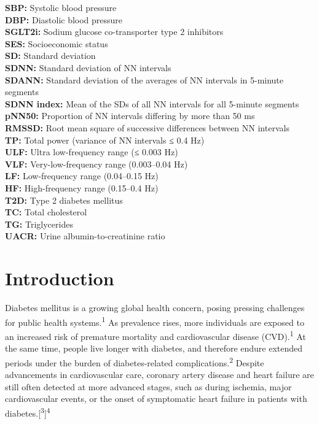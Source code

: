\documentclass[
  letterpaper,
  headsepline=true,
  open=any]{scrbook}
\begin{document}
\textbf{SBP:} Systolic blood pressure\\
\textbf{DBP:} Diastolic blood pressure\\
\textbf{SGLT2i:} Sodium glucose co-transporter type 2 inhibitors\\
\textbf{SES:} Socioeconomic status\\
\textbf{SD:} Standard deviation\\
\textbf{SDNN:} Standard deviation of NN intervals\\
\textbf{SDANN:} Standard deviation of the averages of NN intervals in
5-minute segments\\
\textbf{SDNN index:} Mean of the SDs of all NN intervals for all
5-minute segments\\
\textbf{pNN50:} Proportion of NN intervals differing by more than 50
ms\\
\textbf{RMSSD:} Root mean square of successive differences between NN
intervals\\
\textbf{TP:} Total power (variance of NN intervals ≤ 0.4 Hz)\\
\textbf{ULF:} Ultra low-frequency range (≤ 0.003 Hz)\\
\textbf{VLF:} Very-low-frequency range (0.003--0.04 Hz)\\
\textbf{LF:} Low-frequency range (0.04--0.15 Hz)\\
\textbf{HF:} High-frequency range (0.15--0.4 Hz)\\
\textbf{T2D:} Type 2 diabetes mellitus\\
\textbf{TC:} Total cholesterol\\
\textbf{TG:} Triglycerides\\
\textbf{UACR:} Urine albumin-to-creatinine ratio


\hypertarget{introduction}{%
\chapter{Introduction}\label{introduction}}

\newpage

Diabetes mellitus is a growing global health concern, posing pressing
challenges for public health systems.\textsuperscript{1} As prevalence
rises, more individuals are exposed to an increased risk of premature
mortality and cardiovascular disease (CVD).\textsuperscript{1} At the
same time, people live longer with diabetes, and therefore endure
extended periods under the burden of diabetes-related
complications.\textsuperscript{2} Despite advancements in cardiovascular
care, coronary artery disease and heart failure are still often detected
at more advanced stages, such as during ischemia, major cardiovascular
events, or the onset of symptomatic heart failure in patients with
diabetes.{[}\textsuperscript{3}{]}\textsuperscript{4}
\end{document}
